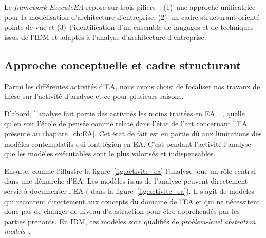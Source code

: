     Le \emph{framework ExecuteEA} repose sur trois piliers~: (1)~une approche unificatrice pour la modélisation d'architecture d'entreprise,
    (2)~un cadre structurant orienté points de vue et (3)~l'identification d'un ensemble de langages et de techniques issus de l'IDM
    et adaptés à l'analyse d'architecture d'entreprise.





   \subsection{Approche conceptuelle et cadre structurant}

Parmi les différentes activités d'EA, nous avons choisi de focaliser nos travaux de thèse sur l'activité
d'analyse et ce pour plusieurs raisons.

D'abord, l'analyse fait partie des activités les moins traitées en EA~\cite{chen2008architectures}~\cite{barn2013enterprise},
quelle qu'en soit l'école de pensée comme relaté dans l'état 
de l'art concernant l'EA présenté au chapitre~\ref{ch:EA}. Cet état de fait est en partie dû
aux limitations des modèles contemplatifs qui font légion en EA. C'est pendant l'activité l'analyse que les modèles
exécutables sont le plus valorisés et indispensables.

Ensuite, comme l'illustre la figure~\ref{fig:activite_ea} l'analyse joue un rôle central dans une démarche d'EA.
Les modèles issus de l'analyse peuvent directement servir à documenter l'EA ( dans la figure~\ref{fig:activite_ea}).
Il s'agit de modèles qui recourent directement aux concepts du domaine de l'EA 
et qui ne nécessitent donc pas de changer de niveau d'abstraction pour être appréhendés par les parties prenants.
En IDM, ces modèles sont qualifiés de \emph{problem-level abstration models}~\cite{france2007model}.

